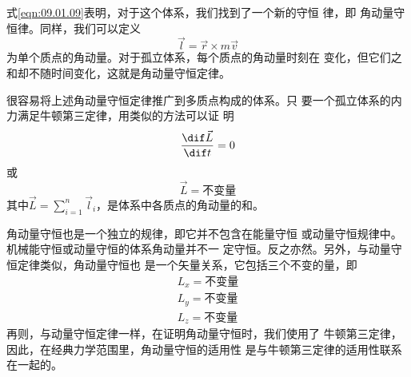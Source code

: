 \documentclass[../outline-of-mechanics.tex]{subfiles}
\begin{document}
式\eqref{eqn:09.01.09}表明，对于这个体系，我们找到了一个新的守恒
律，即
角动量守恒律。同样，我们可以定义
\begin{equation}\label{eqn:09.01.10}
  \vec{l} = \vec{r} \times m \vec{v}
\end{equation}
为单个质点的角动量。对于孤立体系，每个质点的角动量时刻在
变化，但它们之和却不随时间变化，这就是角动量守恒定律。

很容易将上述角动量守恒定律推广到多质点构成的体系。只
要一个孤立体系的内力满足牛顿第三定律，用类似的方法可以证
明
\begin{equation*}
  \frac { \dif \vec{L} } { \dif t } = 0
\end{equation*}
或%
\begin{equation}\label{eqn:09.01.11}
  \vec{L}=\text{不变量}
\end{equation}
其中$\displaystyle \vec{L}=\sum_{i=1}^{n} \vec{l}_i$，是体系中各质点的角动量的和。

角动量守恒也是一个独立的规律，即它并不包含在能量守恒
或动量守恒规律中。机械能守恒或动量守恒的体系角动量并不一
定守恒。反之亦然。另外，与动量守恒定律类似，角动量守恒也
是一个矢量关系，它包括三个不变的量，即
\begin{equation}\label{eqn:09.01.12}
  \begin{aligned}
    L _ { x } = \text{不变量} \\
    L _ { y } = \text{不变量} \\
    L _ { z } = \text{不变量}
  \end{aligned}
\end{equation}
再则，与动量守恒定律一样，在证明角动量守恒时，我们使用了
牛顿第三定律，因此，在经典力学范围里，角动量守恒的适用性
是与牛顿第三定律的适用性联系在一起的。
\end{document}
